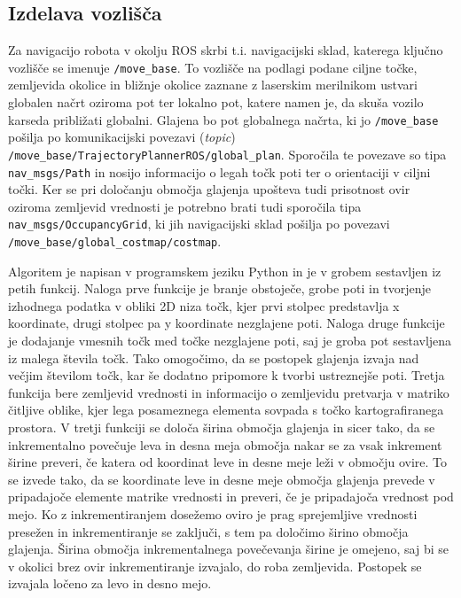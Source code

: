 \documentclass[10pt,a4paper]{article}
\begin{document}
\subsection{Izdelava vozlišča}

Za navigacijo robota v okolju ROS skrbi t.i. navigacijski sklad, katerega ključno vozlišče se imenuje \verb|/move_base|. To vozlišče na podlagi podane ciljne točke, zemljevida okolice in bližnje okolice zaznane z laserskim merilnikom ustvari globalen načrt oziroma pot ter lokalno pot, katere namen je, da skuša vozilo karseda približati globalni. Glajena bo pot globalnega načrta, ki jo \verb|/move_base| pošilja po komunikacijski povezavi (\textit{topic}) \verb|/move_base/TrajectoryPlannerROS/global_plan|. Sporočila te povezave so tipa \verb|nav_msgs/Path| in nosijo informacijo o legah točk poti ter o orientaciji v ciljni točki. Ker se pri določanju območja glajenja upošteva tudi prisotnost ovir oziroma zemljevid vrednosti je potrebno brati tudi sporočila tipa \verb|nav_msgs/OccupancyGrid|, ki jih navigacijski sklad pošilja po povezavi \verb|/move_base/global_costmap/costmap|.

Algoritem je napisan v programskem jeziku Python in je v grobem sestavljen iz petih funkcij. Naloga prve funkcije je branje obstoječe, grobe poti in tvorjenje izhodnega podatka v obliki 2D niza točk, kjer prvi stolpec predstavlja x koordinate, drugi stolpec pa y koordinate nezglajene poti. Naloga druge funkcije je dodajanje vmesnih točk med točke nezglajene poti, saj je groba pot sestavljena iz malega števila točk. Tako omogočimo, da se postopek glajenja izvaja nad večjim številom točk, kar še dodatno pripomore k tvorbi ustreznejše poti. Tretja funkcija bere zemljevid vrednosti in informacijo o zemljevidu pretvarja v matriko čitljive oblike, kjer lega posameznega elementa sovpada s točko kartografiranega prostora. V tretji funkciji se določa širina območja glajenja in sicer tako, da se inkrementalno povečuje leva in desna meja območja nakar se za vsak inkrement širine preveri, če katera od koordinat leve in desne meje leži v območju ovire. To se izvede tako, da se koordinate leve in desne meje območja glajenja prevede v pripadajoče elemente matrike vrednosti in preveri, če je pripadajoča vrednost pod mejo. Ko z inkrementiranjem dosežemo oviro je prag sprejemljive vrednosti presežen in inkrementiranje se zaključi, s tem pa določimo širino območja glajenja. Širina območja inkrementalnega povečevanja širine je omejeno, saj bi se v okolici brez ovir inkrementiranje izvajalo, do roba zemljevida. Postopek se izvajala ločeno za levo in desno mejo.
\end{document}
